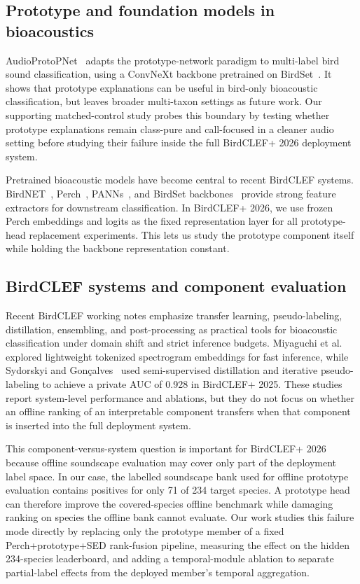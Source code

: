 \documentclass{ceurart}
\begin{document}
\subsection{Prototype and foundation models in bioacoustics}

AudioProtoPNet~\cite{heinrich2025audioprotopnet} adapts the prototype-network paradigm to multi-label bird sound classification, using a ConvNeXt backbone pretrained on BirdSet~\cite{rauch2024birdset}. It shows that prototype explanations can be useful in bird-only bioacoustic classification, but leaves broader multi-taxon settings as future work. Our supporting matched-control study probes this boundary by testing whether prototype explanations remain class-pure and call-focused in a cleaner audio setting before studying their failure inside the full BirdCLEF+ 2026 deployment system.

Pretrained bioacoustic models have become central to recent BirdCLEF systems. BirdNET~\cite{kahl2021birdnet}, Perch~\cite{ghani2023global}, PANNs~\cite{kong2020panns}, and BirdSet backbones~\cite{rauch2024birdset} provide strong feature extractors for downstream classification. In BirdCLEF+ 2026, we use frozen Perch embeddings and logits as the fixed representation layer for all prototype-head replacement experiments. This lets us study the prototype component itself while holding the backbone representation constant.

\subsection{BirdCLEF systems and component evaluation}

Recent BirdCLEF working notes emphasize transfer learning, pseudo-labeling, distillation, ensembling, and post-processing as practical tools for bioacoustic classification under domain shift and strict inference budgets. Miyaguchi et al.~\cite{miyaguchi2025stsg} explored lightweight tokenized spectrogram embeddings for fast inference, while Sydorskyi and Gon\c{c}alves~\cite{sydorskyi2025domainshift} used semi-supervised distillation and iterative pseudo-labeling to achieve a private AUC of 0.928 in BirdCLEF+ 2025. These studies report system-level performance and ablations, but they do not focus on whether an offline ranking of an interpretable component transfers when that component is inserted into the full deployment system.

This component-versus-system question is important for BirdCLEF+ 2026 because offline soundscape evaluation may cover only part of the deployment label space. In our case, the labelled soundscape bank used for offline prototype evaluation contains positives for only 71 of 234 target species. A prototype head can therefore improve the covered-species offline benchmark while damaging ranking on species the offline bank cannot evaluate. Our work studies this failure mode directly by replacing only the prototype member of a fixed Perch+prototype+SED rank-fusion pipeline, measuring the effect on the hidden 234-species leaderboard, and adding a temporal-module ablation to separate partial-label effects from the deployed member's temporal aggregation.
\end{document}
